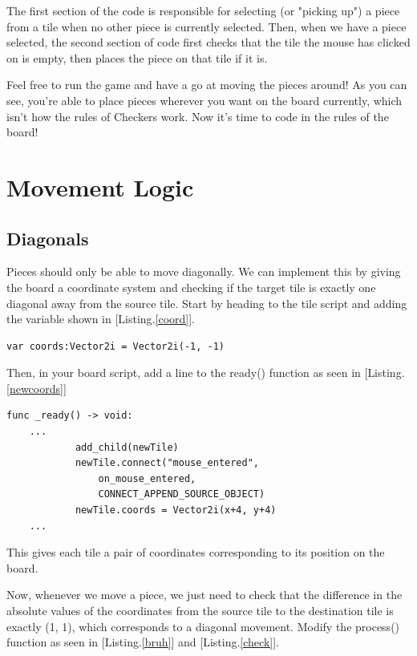 \documentclass[14pt]{extarticle}
\newcommand{\prettyref}[2]{[{#1}.\ref{#2}]}
\begin{document}
The first section of the code is responsible for selecting (or "picking up") a piece from a tile when no other piece is currently selected. Then, when we have a piece selected, the second section of code first checks that the tile the mouse has clicked on is empty, then places the piece on that tile if it is.

Feel free to run the game and have a go at moving the pieces around! As you can see, you're able to place pieces wherever you want on the board currently, which isn't how the rules of Checkers work. Now it's time to code in the rules of the board!

\newpage

\section{Movement Logic}
\subsection*{Diagonals}
Pieces should only be able to move diagonally. We can implement this by giving the board a coordinate system and checking if the target tile is exactly one diagonal away from the source tile. Start by heading to the tile script and adding the variable shown in \prettyref{Listing}{coord}.

\begin{lstlisting}[language=gdscript, label={coord}, caption=Coordinate variable]
var coords:Vector2i = Vector2i(-1, -1)
\end{lstlisting}

Then, in your board script, add a line to the ready() function as seen in \prettyref{Listing}{newcoords}

\begin{lstlisting}[language=gdscript, label={newcoords}, caption=Adding Coordinates to the Board]
func _ready() -> void:
    ...
			add_child(newTile)
			newTile.connect("mouse_entered",
                on_mouse_entered,
                CONNECT_APPEND_SOURCE_OBJECT)
			newTile.coords = Vector2i(x+4, y+4)
    ...
\end{lstlisting}

This gives each tile a pair of coordinates corresponding to its position on the board.

Now, whenever we move a piece, we just need to check that the difference in the absolute values of the coordinates from the source tile to the destination tile is exactly (1, 1), which corresponds to a diagonal movement. Modify the process() function as seen in \prettyref{Listing}{bruh} and \prettyref{Listing}{check}.
\end{document}
